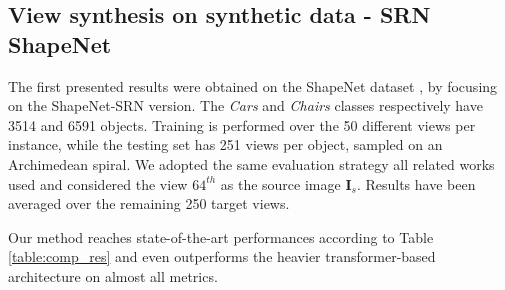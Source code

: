 \subsection{View synthesis on synthetic data - SRN ShapeNet}
The first presented results were obtained on the ShapeNet dataset \cite{chang2015shapenet}, by focusing on the ShapeNet-SRN \cite{SRN} version. The \textit{Cars} and \textit{Chairs} classes respectively have 3514 and 6591 objects. Training is performed over the 50 different views per instance, while the testing set has 251 views per object, sampled on an Archimedean spiral. We adopted the same evaluation strategy all related works used and considered the view $64^{th}$ as the source image $\textbf{I}_{s}$. Results have been  averaged over the remaining 250 target views. 

Our method reaches state-of-the-art performances according to Table \ref{table:comp_res} and even outperforms the heavier transformer-based architecture \cite{visionnerf} on almost all metrics. 

